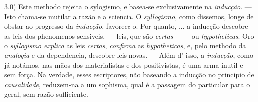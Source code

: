 3.0) Este methodo rejeita o sylogismo, e basea-se exclusivamente na \emph{inducção}. --- Isto chama-se mutilar a razão e a sciencia. O \emph{syllogismo}, como dissemos, longe de obstar ao progresso da \emph{inducção}, favorece-o. Por quanto, ... a inducção descobre as leis dos phenomenos sensiveis, --- leis, que são \emph{certas} ------ ou \emph{hypotheticas}. Oro o \emph{syllogismo explica} as leis \emph{certas}, \emph{confirma} as \emph{hypotheticas}, e, pelo methodo da \emph{analogia} e da dependencia, descobre leis novas. --- Além d' isso, a \emph{inducção}, como já notámos, nas mãos dos materialistas e dos positivistas, é uma arma inutil e sem força. Na verdade, esses escriptores, não baseando a inducção no principio de \emph{causalidade}, reduzem-na a um sophisma, qual é a passagem do particular para o geral, sem razão sufficiente.

